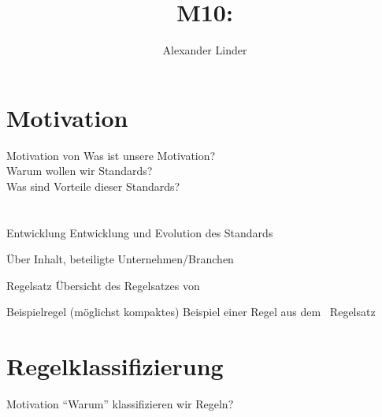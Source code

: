 \documentclass{beamer}
\title{M10: \sqss}
\author{Alexander Linder}
\date{} %
\begin{document}

    \begin{frame}
        \maketitle
    \end{frame}

    \begin{frame}
        \tableofcontents
    \end{frame}

    \section{Motivation}
    \label{sec:motivation}
    \begin{frame}{Motivation von \sqss}
        Was ist unsere Motivation?\\
        Warum wollen wir Standards?\\
        Was sind Vorteile dieser Standards?
    \end{frame}

    \section{\misra}
    \label{sec:misra-c}
    \begin{frame}{Entwicklung}
        Entwicklung und Evolution des Standards
    \end{frame}

    \begin{frame}{Über \misra}
        Inhalt, beteiligte Unternehmen/Branchen
    \end{frame}

    \begin{frame}{Regelsatz}
        Übersicht des Regelsatzes von \misra\
    \end{frame}

    \begin{frame}{Beispielregel}
        (möglichst kompaktes) Beispiel einer Regel aus dem \misra\ Regelsatz
    \end{frame}

    \section{Regelklassifizierung}
    \label{sec:regelklassifizierung}
    \begin{frame}{Motivation}
        \enquote{Warum} klassifizieren wir Regeln?
    \end{frame}
\end{document}

